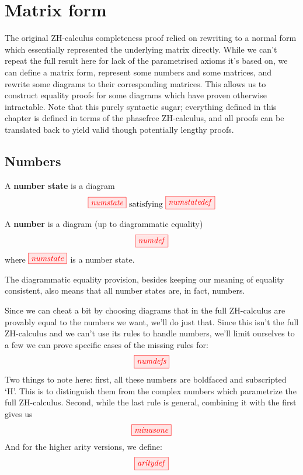\chapter{Matrix form}\label{chap:matrices}
The original ZH-calculus completeness proof relied on rewriting to a normal form
which essentially represented the underlying matrix directly. While we can't
repeat the full result here for lack of the parametrised axioms it's based on,
we can define a matrix form, represent some numbers and some matrices, and
rewrite some diagrams to their corresponding matrices. This allows us to
construct equality proofs for some diagrams which have proven otherwise
intractable. Note that this purely syntactic sugar; everything defined in this
chapter is defined in terms of the phasefree ZH-calculus, and all proofs can be
translated back to yield valid though potentially lengthy proofs.

\section{Numbers}

\begin{definition}
    A \textbf{number state} is a diagram
    $$\tikzfig{numstate} \text{ satisfying } \tikzfig{numstatedef}$$
    
    A \textbf{number} is a diagram (up to diagrammatic equality)
    $$\tikzfig{numdef}$$
    where $\tikzfig{numstate}$ is a number state.
\end{definition}
\begin{remark*}
    The diagrammatic equality provision, besides keeping our meaning of equality
    consistent, also means that all number states are, in fact, numbers.
\end{remark*}

Since we can cheat a bit by choosing diagrams that in the full ZH-calculus are
provably equal to the numbers we want, we'll do just that. Since this isn't the
full ZH-calculus and we can't use its rules to handle numbers, we'll limit
ourselves to a few we can prove specific cases of the missing rules for:
$$\tikzfig{numdefs}$$
Two things to note here: first, all these numbers are boldfaced and subscripted
`H'. This is to distinguish 
them from the complex numbers which parametrize the full ZH-calculus. Second,
while the last rule is general, combining it with the first gives us
$$\tikzfig{minusone}$$
And for the higher arity versions, we define:
$$\tikzfig{aritydef}$$

